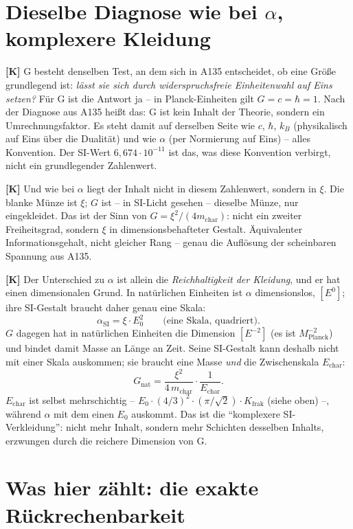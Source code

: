 \section{Dieselbe Diagnose wie bei $\alpha$, komplexere Kleidung}

\textbf{[K]} G besteht denselben Test, an dem sich in A135 entscheidet, ob eine
Größe grundlegend ist: \emph{lässt sie sich durch widerspruchsfreie
Einheitenwahl auf Eins setzen?} Für G ist die Antwort ja -- in Planck-Einheiten
gilt $G = c = \hbar = 1$. Nach der Diagnose aus A135 heißt das: G ist kein
Inhalt der Theorie, sondern ein Umrechnungsfaktor. Es steht damit auf derselben
Seite wie $c$, $\hbar$, $k_B$ (physikalisch auf Eins über die Dualität) und wie
$\alpha$ (per Normierung auf Eins) -- alles Konvention. Der SI-Wert
$6{,}674\cdot10^{-11}$ ist das, was diese Konvention verbirgt, nicht ein
grundlegender Zahlenwert.

\textbf{[K]} Und wie bei $\alpha$ liegt der Inhalt nicht in diesem Zahlenwert,
sondern in $\xi$. Die blanke Münze ist $\xi$; $G$ ist -- in SI-Licht gesehen --
dieselbe Münze, nur eingekleidet. Das ist der Sinn von $G = \xi^2/(4m_\text{char})$:
nicht ein zweiter Freiheitsgrad, sondern $\xi$ in dimensionsbehafteter Gestalt.
Äquivalenter Informationsgehalt, nicht gleicher Rang -- genau die Auflösung der
scheinbaren Spannung aus A135.

\textbf{[K]} Der Unterschied zu $\alpha$ ist allein die \emph{Reichhaltigkeit
der Kleidung}, und er hat einen dimensionalen Grund. In natürlichen Einheiten
ist $\alpha$ dimensionslos, $[E^0]$; ihre SI-Gestalt braucht daher genau eine
Skala:
\[
  \alpha_\text{SI} = \xi\cdot E_0^2 \qquad\text{(eine Skala, quadriert).}
\]
$G$ dagegen hat in natürlichen Einheiten die Dimension $[E^{-2}]$
(es ist $M_\text{Planck}^{-2}$) und bindet damit Masse an Länge an Zeit. Seine
SI-Gestalt kann deshalb nicht mit einer Skala auskommen; sie braucht eine Masse
\emph{und} die Zwischenskala $E_\text{char}$:
\[
  G_\text{nat} = \frac{\xi^2}{4\,m_\text{char}}\cdot\frac{1}{E_\text{char}}.
\]
$E_\text{char}$ ist selbst mehrschichtig -- $E_0\cdot(4/3)^2\cdot(\pi/\sqrt2)\cdot
K_\text{frak}$ (siehe oben) --, während $\alpha$ mit dem einen $E_0$ auskommt.
Das ist die \enquote{komplexere SI-Verkleidung}: nicht mehr Inhalt, sondern mehr
Schichten desselben Inhalts, erzwungen durch die reichere Dimension von G.

\section{Was hier zählt: die exakte Rückrechenbarkeit}

